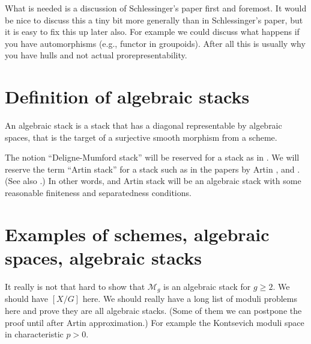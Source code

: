 \noindent
What is needed is a discussion of Schlessinger's paper first and foremost.
It would be nice to discuss this a tiny bit more generally than in
Schlessinger's paper, but it is easy to fix this up later also.
For example we could discuss what happens if you have automorphisms
(e.g., functor in groupoids). After all this is usually why you have
hulls and not actual prorepresentability.


\section{Definition of algebraic stacks}
\label{section-definition-algebraic-stacks}

\noindent
An algebraic stack is a stack that has a diagonal representable by algebraic
spaces, that is the target of a surjective smooth morphism from a scheme.

\medskip\noindent
The notion ``Deligne-Mumford stack'' will be reserved for a stack as in
\cite{DM}. We will reserve the term ``Artin stack'' for
a stack such as in the papers by Artin \cite{ArtinI}, and \cite{ArtinVersal}.
(See also \cite{conrad-dejong}.) In other words, and Artin stack will be an
algebraic stack with some reasonable finiteness and separatedness conditions.


\section{Examples of schemes, algebraic spaces, algebraic stacks}
\label{section-examples-stacks}

\noindent
It really is not that hard to show that $\mathcal{M}_g$ is an algebraic
stack for $g\geq 2$. We should have $[X/G]$ here. We should really
have a long list of moduli problems here and prove they are all algebraic
stacks. (Some of them we can postpone the proof until after Artin
approximation.) For example the Kontsevich moduli space in characteristic
$p > 0$.

